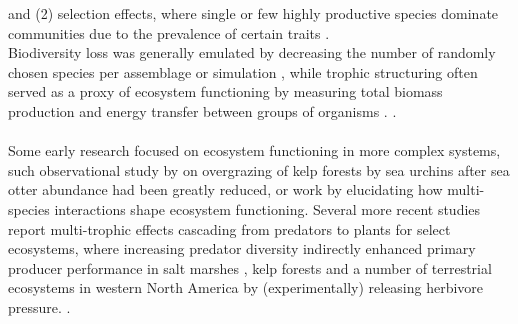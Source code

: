  and (2) selection effects, where single or few highly productive species dominate communities due to the prevalence of certain traits \citep{Loreau2001,Tilman2001}.\\
Biodiversity loss was generally emulated by decreasing the number of randomly chosen species per assemblage or simulation \citep{Tilman2001,Thebault2003,Ives2005}, while trophic structuring often served as a proxy of ecosystem functioning by measuring total biomass production and energy transfer between groups of organisms \citep[cf.][]{Tilman2014}.
  . \\\\
%
Some early research focused on ecosystem functioning in more complex systems, such observational study by \cite{Estes1974} on overgrazing of kelp forests by sea urchins after sea otter abundance had been greatly reduced, or work by \cite{Sih1998} elucidating how multi-species interactions shape ecosystem functioning. 
Several more recent studies report multi-trophic effects cascading from predators to plants for select ecosystems, where increasing predator diversity indirectly enhanced primary producer performance in salt marshes \citep{Finke2004}, kelp forests \citep{Byrnes2006} and a number  of terrestrial ecosystems in western North America \citep{Beschta2009} by (experimentally) releasing herbivore pressure. 
. 

